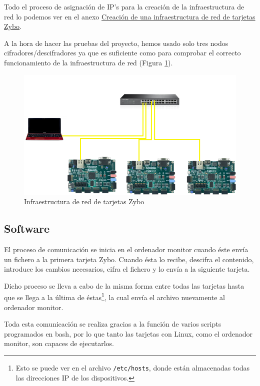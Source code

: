 Todo el proceso de asignación de IP's para la creación de la infraestructura de red lo podemos ver en el anexo \hyperlink{CreacionInfraestructura}{Creación de una infraestructura de red de tarjetas Zybo}.

A la hora de hacer las pruebas del proyecto, hemos usado solo tres nodos cifradores/descifradores ya que es suficiente como para comprobar el correcto funcionamiento de la infraestructura de red (Figura \ref{Infraestructura de red de tarjetas Zybo}).

\begin{figure}[h]
	\centering
	\includegraphics[scale=0.5]{Epilogo/RedCompleta.png}
	\caption{Infraestructura de red de tarjetas Zybo}
	\label{Infraestructura de red de tarjetas Zybo}
\end{figure}

\subsection{Software}
El proceso de comunicación se inicia en el ordenador monitor cuando éste envía un fichero a la primera tarjeta Zybo. Cuando ésta lo recibe, descifra el contenido, introduce los cambios necesarios, cifra el fichero y lo envía a la siguiente tarjeta.

Dicho proceso se lleva a cabo de la misma forma entre todas las tarjetas hasta que se llega a la última de éstas\footnote{Esto se puede ver en el archivo \texttt{/etc/hosts}, donde están almacenadas todas las direcciones IP de los dispositivos.}, la cual envía el archivo nuevamente al ordenador monitor.

Toda esta comunicación se realiza gracias a la función de varios scripts programados en bash, por lo que tanto las tarjetas con Linux, como el ordenador monitor, son capaces de ejecutarlos.

